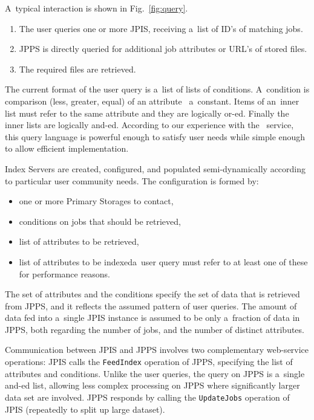 A~typical  interaction is shown in Fig.~\ref{fig:query}.%

\begin{enumerate}
\item The user queries one or more JPIS, receiving a~list of ID's
of matching jobs.
\item JPPS is directly queried for additional job attributes or URL's of 
stored files.
\item The required files are retrieved.
\end{enumerate}

The current format of the user query is a~list of lists of conditions.
A~condition is comparison (less, greater, equal) of an attribute 
\wrt\ a~constant. Items of an~inner list must refer to the same attribute
and they are logically or-ed.
Finally the inner lists are logically and-ed. 
According to our experience with the \LB\ service,
this query language is powerful enough to satisfy user needs 
while simple enough to allow efficient implementation.

Index Servers are created, configured, and populated  semi-dynamically
according to particular user community needs. 
The configuration is formed by:
\begin{itemize}
\item one or more Primary Storages to contact,
\item conditions on jobs that should be retrieved,
\item list of attributes to be retrieved,
\item list of attributes to be indexed\Dash a~user query must refer
to at least one of these for performance reasons.
\end{itemize}
The set of attributes and the conditions specify the set of data that
is retrieved from JPPS, and it reflects the assumed pattern
of user queries.
The amount of data fed into a~single JPIS instance is assumed to be
only a~fraction of data in JPPS,
both regarding the number of jobs, and the number of distinct attributes.

Communication between JPIS and JPPS involves two
complementary web-service operations: 
JPIS calls the \texttt{FeedIndex} operation of JPPS,
specifying the list of attributes and conditions. 
Unlike the user queries, the query on JPPS is a~single and-ed list,
allowing less complex processing on JPPS where significantly larger
data set are involved.
JPPS responds by calling the \texttt{UpdateJobs} operation of JPIS
(repeatedly to split up large dataset).

